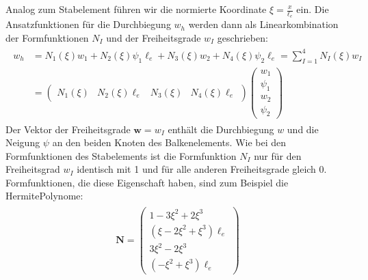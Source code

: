 \documentclass[letterpaper,10pt,german]{jupyterBook}
\begin{document}
\sphinxAtStartPar
Analog zum Stabelement führen wir die normierte Koordinate \(\xi=\frac{x}{\ell_e}\) ein. Die Ansatzfunktionen für die Durchbiegung \(w_h\) werden dann als Linearkombination der Formfunktionen \(N_I\) und der Freiheitsgrade \(w_I\) geschrieben:
\begin{equation}\label{equation:chapters/chapter2/BalkenFEM:Ansatz_Balken}
\begin{split}\begin{align}
  w_h & = N_1(\xi) w_1 + N_2(\xi) \psi_1 \ell_e +  N_3(\xi) w_2 + N_4(\xi) \psi_2 \ell_e = \sum_{I=1}^{4} N_I(\xi) w_I \\
  & = \begin{pmatrix} N_1(\xi) & N_2(\xi)\ell_e & N_3(\xi) & N_4(\xi)\ell_e \end{pmatrix} \begin{pmatrix} w_1 \\ \psi_1 \\ w_2 \\ \psi_2 \end{pmatrix}
\end{align}\end{split}
\end{equation}
\sphinxAtStartPar
Der Vektor der Freiheitsgrade \(\bm{w}=w_I\) enthält die Durchbiegung \(w\) und die Neigung \(\psi\) an den beiden Knoten des Balkenelements. Wie bei den Formfunktionen des Stabelements ist die Formfunktion \(N_I\) nur für den Freiheitsgrad \(w_I\) identisch mit 1 und für alle anderen Freiheitsgrade gleich 0. Formfunktionen, die diese Eigenschaft haben, sind zum Beispiel die Hermite\sphinxhyphen{}Polynome:
\begin{equation}\label{equation:chapters/chapter2/BalkenFEM:Formfunktion_Balken}
\begin{split}\begin{align}
  \bm{N} = \begin{pmatrix} 
  1-3\xi^2+2\xi^3 \\ 
  (\xi-2\xi^2+\xi^3)\ell_e \\ 
  3\xi^2-2\xi^3 \\ 
  (-\xi^2+\xi^3)\ell_e \end{pmatrix}
\end{align}\end{split}
\end{equation}
\end{document}
